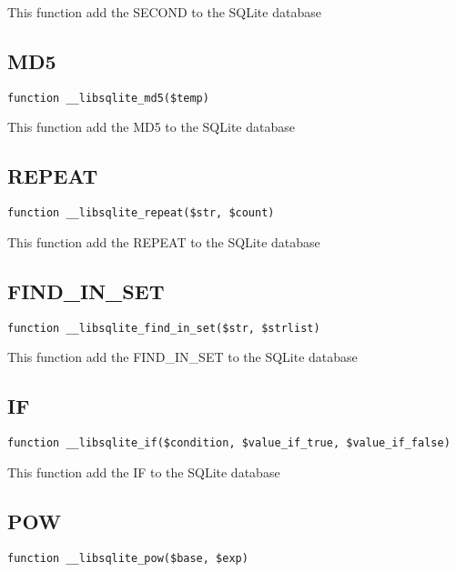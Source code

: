\documentclass[a4paper]{book}
\begin{document}
This function add the SECOND to the SQLite database

\hypertarget{toc309}{}
\subsection{MD5}

\begin{lstlisting}
function __libsqlite_md5($temp)
\end{lstlisting}

This function add the MD5 to the SQLite database

\hypertarget{toc310}{}
\subsection{REPEAT}

\begin{lstlisting}
function __libsqlite_repeat($str, $count)
\end{lstlisting}

This function add the REPEAT to the SQLite database

\hypertarget{toc311}{}
\subsection{FIND\_IN\_SET}

\begin{lstlisting}
function __libsqlite_find_in_set($str, $strlist)
\end{lstlisting}

This function add the FIND\_IN\_SET to the SQLite database

\hypertarget{toc312}{}
\subsection{IF}

\begin{lstlisting}
function __libsqlite_if($condition, $value_if_true, $value_if_false)
\end{lstlisting}

This function add the IF to the SQLite database

\hypertarget{toc313}{}
\subsection{POW}

\begin{lstlisting}
function __libsqlite_pow($base, $exp)
\end{lstlisting}
\end{document}
